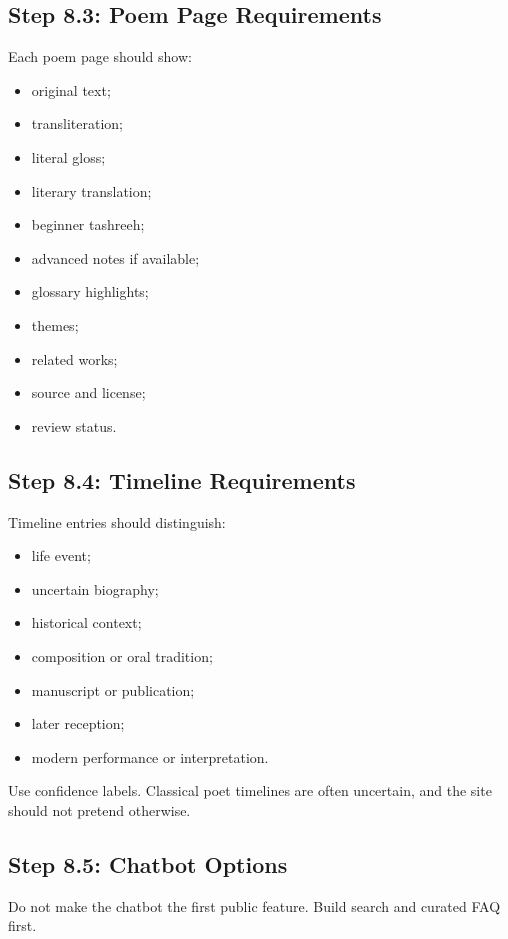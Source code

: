 \documentclass[11pt]{article}
\begin{document}
\subsection{Step 8.3: Poem Page Requirements}

Each poem page should show:

\begin{itemize}
  \item original text;
  \item transliteration;
  \item literal gloss;
  \item literary translation;
  \item beginner tashreeh;
  \item advanced notes if available;
  \item glossary highlights;
  \item themes;
  \item related works;
  \item source and license;
  \item review status.
\end{itemize}

\subsection{Step 8.4: Timeline Requirements}

Timeline entries should distinguish:

\begin{itemize}
  \item life event;
  \item uncertain biography;
  \item historical context;
  \item composition or oral tradition;
  \item manuscript or publication;
  \item later reception;
  \item modern performance or interpretation.
\end{itemize}

Use confidence labels. Classical poet timelines are often uncertain, and the site
should not pretend otherwise.

\subsection{Step 8.5: Chatbot Options}

Do not make the chatbot the first public feature. Build search and curated FAQ
first.
\end{document}
